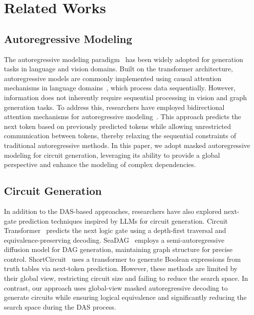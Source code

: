 \section{Related Works}
\label{sec:related}

\subsection{Autoregressive Modeling}
The autoregressive modeling paradigm~\cite{openai2023gpt4, tian2024var} has been widely adopted for generation tasks in language and vision domains. 
Built on the transformer architecture, autoregressive models are commonly implemented using causal attention mechanisms in language domains~\cite{openai2023gpt4}, which process data sequentially. 
However, information does not inherently require sequential processing in vision and graph generation tasks. 
To address this, researchers have employed bidirectional attention mechanisms for autoregressive modeling~\cite{li2024mar, tian2024var,chang2022maskgit,li2023mage}. 
This approach predicts the next token based on previously predicted tokens while allowing unrestricted communication between tokens, thereby relaxing the sequential constraints of traditional autoregressive methods. 
In this paper, we adopt masked autoregressive modeling for circuit generation, leveraging its ability to provide a global perspective and enhance the modeling of complex dependencies.

\subsection{Circuit Generation}  
In addition to the DAS-based approaches, researchers have also explored next-gate prediction techniques inspired by LLMs for circuit generation. 
Circuit Transformer~\cite{li2024circuittrans} predicts the next logic gate using a depth-first traversal and equivalence-preserving decoding. 
SeaDAG~\cite{zhou2024seadag} employs a semi-autoregressive diffusion model for DAG generation, maintaining graph structure for precise control. 
ShortCircuit~\cite{tsaras2024shortcircuit} uses a transformer to generate Boolean expressions from truth tables via next-token prediction.
However, these methods are limited by their global view, restricting circuit size and failing to reduce the search space. 
In contrast, our approach uses global-view masked autoregressive decoding to generate circuits while ensuring logical equivalence and significantly reducing the search space during the DAS process.
